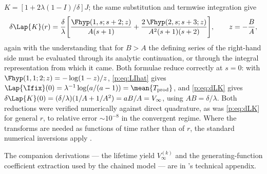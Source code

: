 $K=[1+2\lambda(1-I)/\delta]J$; the same substitution and termwise
integration give
\begin{equation}
\delta\Lap{K}(r)=\frac{\delta}{\lambda}
\Biggl[
\frac{\Fhyp(1,s;s+2;z)}{A(s+1)}
+\frac{2\,\Fhyp(2,s;s+3;z)}{A^2(s+1)(s+2)}
\Biggr],
\qquad z=-\frac{B}{A},
\label{p:eq:dLK}
\end{equation}
again with the understanding that for $B>A$ the defining series of the
right-hand side must be evaluated through its analytic continuation, or
through the integral representation from which it came. Both formulae reduce
correctly at $s=0$: with $\Fhyp(1,1;2;z)=-\log(1-z)/z$, \cref{p:eq:LIhat}
gives $\Lap{\Ifix}(0)=\lambda^{-1}\log(a/(a-1))=\mean{T_{\rm prod}}$, and
\cref{p:eq:dLK} gives $\delta\Lap{K}(0)=(\delta/\lambda)(1/A+1/A^2)
=aB/A=V_\infty$, using $AB=\delta/\lambda$. Both reductions were verified
numerically against direct quadrature, as was \cref{p:eq:dLK} for general
$r$, to relative error $\sim10^{-8}$ in the convergent regime. Where the
transforms are needed as functions of time rather than of $r$, the standard
numerical inversions apply
\cite{stehfest1970algorithm,gaver1965observations}.

The companion derivations --- the lifetime yield $V_\infty^{(k)}$ and the
generating-function coefficient extraction used by the chained model --- are
in \ChDist{}'s technical appendix.

\FloatBarrier
